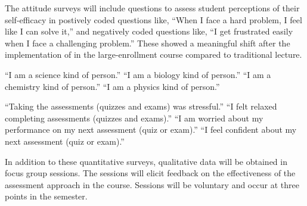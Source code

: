 \documentclass[10pt,letterpaper]{article}
\begin{document}
The attitude surveys will include questions to assess student perceptions of their self-efficacy in postively coded questions like, ``When I face a hard problem, I feel like I can solve it,'' and negatively coded questions like, ``I get frustrated easily when I face a challenging problem.'' These showed a meaningful shift after the implementation of \pogil  in the large-enrollment course compared to traditional lecture.

``I am a science kind of person.'' ``I am a biology kind of person.'' ``I am a chemistry kind of person.'' ``I am a physics kind of person.'' 

``Taking the assessments (quizzes and exams) was stressful.'' ``I felt relaxed completing assessments (quizzes and exams).'' ``I am worried about my performance on my next assessment (quiz or exam).'' ``I feel confident about my next assessment (quiz or exam).''

 In addition to these quantitative surveys, qualitative data will be obtained in focus group sessions. The sessions will elicit feedback on the effectiveness of the assessment approach in the course. Sessions will be voluntary and occur at three points in the semester.
\end{document}

